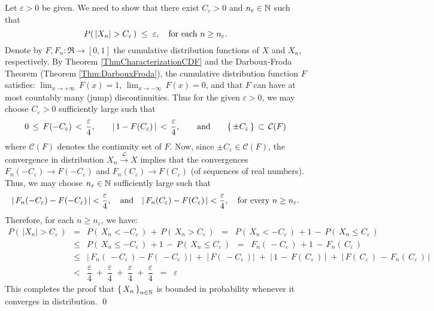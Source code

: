 \proof
Let $\varepsilon > 0$ be given.
We need to show that there exist $C_{\varepsilon} > 0$ and $n_{\varepsilon} \in \mathbb{N}$ such that
\begin{equation*}
P\!\left(\,|X_{n}| > C_{\varepsilon} \,\right) \; \leq \; \varepsilon,
\quad
\textnormal{for each $n \geq n_{\varepsilon}$}.
\end{equation*}
Denote by $F, F_{n} : \Re \longrightarrow [0,1]$ the cumulative distribution functions of $X$ and $X_{n}$, respectively.
By Theorem \ref{ThmCharacterizationCDF} and
the Darboux-Froda Theorem (Theorem \ref{Thm:DarbouxFroda}),
the cumulative distribution function $F$ satisfies:
$\lim_{x\rightarrow+\infty}\,F(x) = 1$, $\lim_{x\rightarrow-\infty}\,F(x) = 0$, and that
$F$ can have at most countably many (jump) discontinuities.
Thus for the given $\varepsilon > 0$, we may choose $C_{\varepsilon} > 0$ sufficiently large such that
\begin{equation*}
0 \,\leq\, F(-C_{\varepsilon}) \,<\, \dfrac{\varepsilon}{4},
\quad\quad
\vert\,1 - F(C_{\varepsilon})\,\vert \, < \, \dfrac{\varepsilon}{4},
\quad\quad\textnormal{and}\quad\quad
\{\,\pm C_{\varepsilon}\,\} \,\subset\, \mathcal{C}(F)
\end{equation*}
where $\mathcal{C}(F)$ denotes the continuity set of $F$.
Now, since $\pm C_{\varepsilon} \in \mathcal{C}(F)$, the convergence in distribution
$X_{n} \overset{\mathcal{L}}{\longrightarrow} X$ implies that the convergences
$F_{n}(-C_{\varepsilon}) \longrightarrow F(-C_{\varepsilon})$ and
$F_{n}(C_{\varepsilon}) \longrightarrow F(C_{\varepsilon})$ (of sequences of real numbers).
Thus, we may choose $n_{\varepsilon} \in \mathbb{N}$ sufficiently large such that
\begin{equation*}
\vert\,F_{n}(-C_{\varepsilon}) - F(-C_{\varepsilon})\,\vert < \dfrac{\varepsilon}{4},
\quad\textnormal{and}\quad
\vert\,F_{n}(C_{\varepsilon}) - F(C_{\varepsilon})\,\vert < \dfrac{\varepsilon}{4},
\quad\textnormal{for every $n \geq n_{\varepsilon}$}.
\end{equation*}
Therefore, for each $n \geq n_{\varepsilon}$, we have:
\begin{eqnarray*}
P\!\left(\,|X_{n}| > C_{\varepsilon} \,\right)
&=& P\!\left(\,X_{n} < - C_{\varepsilon} \,\right) \, + \, P\!\left(\, X_{n} > C_{\varepsilon} \,\right)
\;\;=\;\; P\!\left(\,X_{n} < - C_{\varepsilon} \,\right) \, + 1 \, - \, P\!\left(\, X_{n} \leq C_{\varepsilon} \,\right)
\\
&\leq& P\!\left(\,X_{n} \leq - C_{\varepsilon} \,\right) \, + 1 \, - \, P\!\left(\, X_{n} \leq C_{\varepsilon} \,\right)
\;\;=\;\; F_{n}\!\left(\, - C_{\varepsilon} \,\right) \, + 1 \, - \, F_{n}\!\left(\, C_{\varepsilon} \,\right)
\\
&\leq& \vert\,F_{n}\!\left(\, - C_{\varepsilon} \,\right) - F\!\left(\,-C_{\varepsilon}\,\right)\vert \; + \; \vert\,F\!\left(\,-C_{\varepsilon}\,\right)\vert \; + \;
\vert\, 1 \, - \, F\!\left(\, C_{\varepsilon} \,\right)\,\vert \;+\; \vert\, F\!\left(\, C_{\varepsilon} \,\right) \, - \, F_{n}\!\left(\, C_{\varepsilon} \,\right)\,\vert
\\
&<& \dfrac{\varepsilon}{4} \; + \; \dfrac{\varepsilon}{4} \; + \; \dfrac{\varepsilon}{4} \; + \; \dfrac{\varepsilon}{4} \;\; = \;\; \varepsilon
\end{eqnarray*}
This completes the proof that $\left\{\,X_{n}\,\right\}_{n\in\mathbb{N}}$ is bounded in probability whenever it converges in distribution.
\qed

